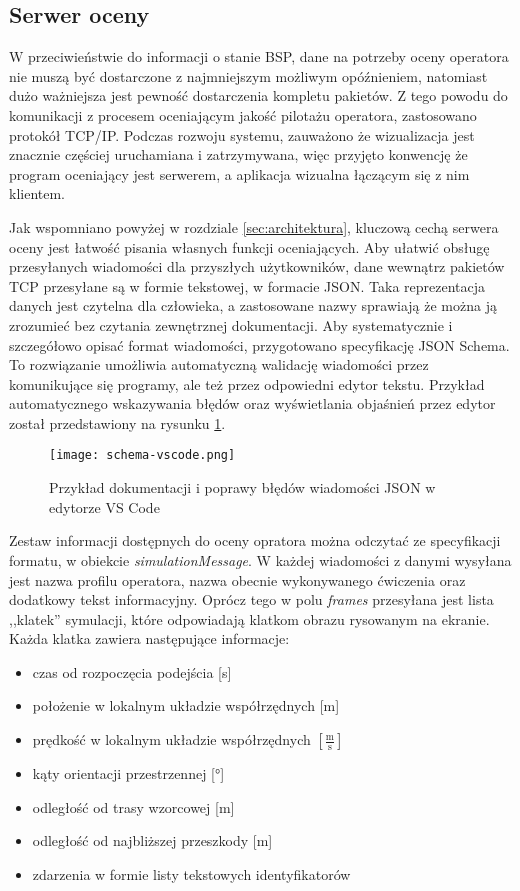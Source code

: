 \subsection{Serwer oceny}
W przeciwieństwie do informacji o stanie BSP, dane na potrzeby oceny operatora nie muszą być dostarczone z najmniejszym możliwym opóźnieniem, natomiast dużo ważniejsza jest pewność dostarczenia kompletu pakietów. Z tego powodu do komunikacji z procesem oceniającym jakość pilotażu operatora, zastosowano protokół TCP/IP. Podczas rozwoju systemu, zauważono że wizualizacja jest znacznie częściej uruchamiana i zatrzymywana, więc przyjęto konwencję że program oceniający jest serwerem, a aplikacja wizualna łączącym się z nim klientem.

Jak wspomniano powyżej w rozdziale \ref{sec:architektura}, kluczową cechą serwera oceny jest łatwość pisania własnych funkcji oceniających. Aby ułatwić obsługę przesyłanych wiadomości dla przyszłych użytkowników, dane wewnątrz pakietów TCP przesyłane są w formie tekstowej, w formacie JSON\cite{json2017}. Taka reprezentacja danych jest czytelna dla człowieka, a zastosowane nazwy sprawiają że można ją zrozumieć bez czytania zewnętrznej dokumentacji. Aby systematycznie i szczegółowo opisać format wiadomości, przygotowano specyfikację JSON Schema\cite{jsonschema2020}. To rozwiązanie umożliwia automatyczną walidację wiadomości przez komunikujące się programy, ale też przez odpowiedni edytor tekstu. Przykład automatycznego wskazywania błędów oraz wyświetlania objaśnień przez edytor został przedstawiony na rysunku \ref{fig:schema-vscode}.

\begin{figure}[!h]
    \centering \texttt{[image: schema-vscode.png]}
    \caption{Przykład dokumentacji i poprawy błędów wiadomości JSON w edytorze VS Code}
    \label{fig:schema-vscode}
\end{figure}

Zestaw informacji dostępnych do oceny opratora można odczytać ze specyfikacji formatu, w obiekcie \emph{simulationMessage}. W każdej wiadomości z danymi wysyłana jest nazwa profilu operatora, nazwa obecnie wykonywanego ćwiczenia oraz dodatkowy tekst informacyjny. Oprócz tego w polu \emph{frames} przesyłana jest lista ,,klatek'' symulacji, które odpowiadają klatkom obrazu rysowanym na ekranie. Każda klatka zawiera następujące informacje:

\begin{itemize}
    \item czas od rozpoczęcia podejścia [s]
    \item położenie w lokalnym układzie współrzędnych [m]
    \item prędkość w lokalnym układzie współrzędnych $ \left[ \frac{\text{m}}{\text{s}} \right] $
    \item kąty orientacji przestrzennej [°]
    \item odległość od trasy wzorcowej [m]
    \item odległość od najbliższej przeszkody [m]
    \item zdarzenia w formie listy tekstowych identyfikatorów
\end{itemize}

